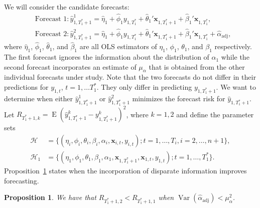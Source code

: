 \documentclass[11pt]{article}
\newcommand{\x}{\textbf{x}}
\newcommand{\Hist}{\mathcal{H}}
\DeclareMathOperator{\E}{E}
\DeclareMathOperator{\Var}{Var}
\newtheorem{prop}{Proposition}
\begin{document}
We will consider the candidate 
forecasts: 
\begin{align*}
  &\text{Forecast 1}: \hat y_{1,T_1^*+1}^1 = \hat\eta_1 
    + \hat\phi_1 y_{1,T_1^*} + \hat\theta_1'\x_{1,T_1^*+1} 
    + \hat\beta_1'\x_{1,T_1^*}, \\
  &\text{Forecast 2}: \hat y_{1,T_1^*+1}^2 = \hat\eta_1 
    + \hat\phi_1 y_{1,T_1^*} + \hat\theta_1'\x_{1,T_1^*+1} 
    + \hat\beta_1'\x_{1,T_1^*} + \hat{\alpha}_{\text{adj}},
\end{align*}
where $\hat\eta_1$, $\hat\phi_1$, $\hat\theta_1$, and $\hat\beta_1$ are all 
OLS estimators of $\eta_1$, $\phi_1$, $\theta_1$, and $\beta_1$ respectively.  
The first forecast ignores the information about the distribution of 
$\alpha_1$ while the second forecast incorporates an estimate of $\mu_\alpha$ 
that is obtained from the other individual forecasts under study.  
Note that the two forecasts do not differ in their predictions for 
$y_{1,t}$, $t = 1,\ldots T_1^*$.  They only differ in predicting 
$y_{1,T_1^*+1}$.  We want to determine when either $\hat y_{1,T_1^*+1}^1$ or 
$\hat y_{1,T_1^*+1}^2$ minimizes the forecast risk for $\hat y_{1,T_1^*+1}$.  
Let $R_{T_1^*+1, k} = \E(\hat y_{1,T_1^*+1}^k - y_{1,T_1^*+1}^k)^2$, where 
$k = 1,2$ and define the parameter sets 
\begin{equation}
\begin{split}
  \Hist &= \{(\eta_i, \phi_i, \theta_i, \beta_i, \alpha_i, \x_{i,t}, y_{i,t}); 
    t = 1,\ldots,T_i, i = 2,\ldots,n+1\}, \\
  \Hist_1 &= \{(\eta_1, \phi_1, \theta_1, \beta_1, \alpha_1, 
    \x_{1,T_1^*+1}, \x_{1,t}, y_{1,t});  t = 1,\ldots,T_1^*\}.
\label{Hist}
\end{split}
\end{equation}
Proposition~\ref{prop:R1R2} states when the incorporation of disparate 
information improves forecasting.

\begin{prop}
We have that $R_{T_1^*+1, 2} < R_{T_1^*+1, 1}$ when 
$\Var(\hat{\alpha}_{\text{adj}}) < \mu_{\alpha}^2$.
\label{prop:R1R2}
\end{prop}
\end{document}

